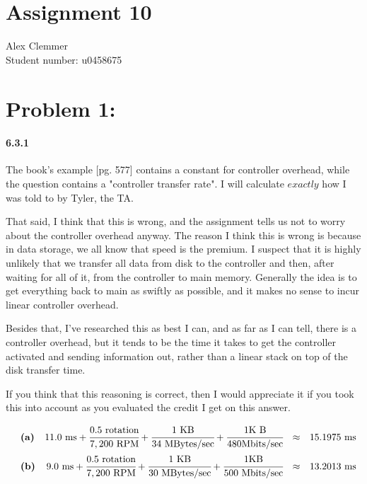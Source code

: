 \documentclass[a4paper]{article}
\begin{document}
\section*{Assignment 10}
Alex Clemmer\\
Student number: u0458675

\section*{Problem 1:}

\paragraph{6.3.1} The book's example [pg. 577] contains a constant for controller overhead, while the question contains a "controller transfer rate". I will calculate $\textit{exactly}$ how I was told to by Tyler, the TA.

That said, I think that this is wrong, and the assignment tells us not to worry about the controller overhead anyway. The reason I think this is wrong is because in data storage, we all know that speed is the premium. I suspect that it is highly unlikely that we transfer all data from disk to the controller and then, after waiting for all of it, from the controller to main memory. Generally the idea is to get everything back to main as swiftly as possible, and it makes no sense to incur linear controller overhead.

Besides that, I've researched this as best I can, and as far as I can tell, there is a controller overhead, but it tends to be the time it takes to get the controller activated and sending information out, rather than a linear stack on top of the disk transfer time.

If you think that this reasoning is correct, then I would appreciate it if you took this into account as you evaluated the credit I get on this answer.

\begin{equation}
\begin{array}{llrll}
& \textbf{(a)} & 11.0 \mbox{ ms} + \cfrac{0.5 \mbox{ rotation}}{7,200 \mbox{ RPM}} + \cfrac{1 \mbox{ KB}}{34 \mbox{ MBytes/sec}} + \cfrac{1 \mbox{K B}}{480 \mbox{Mbits/sec}} & \approx & 15.1975 \mbox{ ms} \\[.15in]
& \textbf{(b)} & 9.0 \mbox{ ms} + \cfrac{0.5 \mbox{ rotation}}{7,200 \mbox{ RPM}} + \cfrac{1 \mbox{ KB}}{30 \mbox{ MBytes/sec}} + \cfrac{1 \mbox{KB}}{500 \mbox{ Mbits/sec}} & \approx & 13.2013 \mbox{ ms}
\end{array}
\end{equation}
\end{document}
